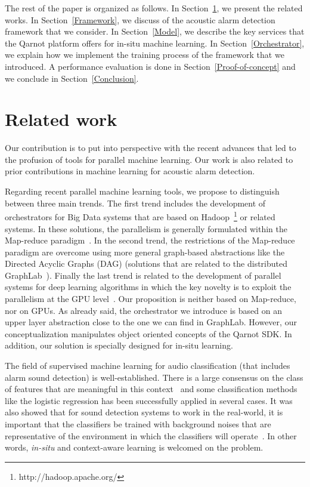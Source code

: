 \documentclass[10pt, conference, compsocconf]{IEEEtran}
\begin{document}
The rest of the paper is organized as follows. In Section~\ref{Related}, we present the related works. 
In Section~\ref{Framework}, we discuss of the acoustic alarm detection framework that we consider. In Section~\ref{Model}, we describe 
the key services that the Qarnot platform offers for in-situ machine learning. In Section~\ref{Orchestrator}, we explain 
how we implement the training process of the framework that we introduced. A performance evaluation is done in 
Section~\ref{Proof-of-concept} and we conclude in Section~\ref{Conclusion}.

\section{Related work} \label{Related}

Our contribution is to put into perspective with the recent advances that led to the profusion of tools for parallel 
machine learning. Our work is also related to prior contributions in machine learning for acoustic alarm detection. 

Regarding recent parallel machine learning tools, we propose to distinguish between three main trends. 
The first trend includes the development of orchestrators for Big Data systems that are based on Hadoop~\footnote{http://hadoop.apache.org/} or related systems. 
In these solutions, the parallelism is generally formulated within the Map-reduce paradigm~\cite{DBLP:journals/cacm/DeanG10}. 
In the second trend, the restrictions of the Map-reduce paradigm are overcome using more general graph-based abstractions like 
the Directed Acyclic Graphs (DAG) (solutions that are related to the distributed GraphLab~\cite{Low:2012:DGF:2212351.2212354}).  Finally the last trend is related to the development of parallel systems for deep learning algorithms in which the key novelty is to exploit the parallelism at the GPU level~\cite{Raina:2009:LDU:1553374.1553486}.
Our proposition is neither based on Map-reduce, nor on GPUs. As already said, the orchestrator we introduce 
is based on an upper layer abstraction close to the one we can find in GraphLab. However, our conceptualization manipulates object 
oriented concepts of the Qarnot SDK. In addition, our solution is specially designed for in-situ learning. 

The field of supervised machine learning for audio classification (that includes alarm sound detection) is well-established. There is a large consensus on the class of features that are meaningful in this context~\cite{Mckinney03featuresfor,DBLP:journals/taslp/JoderER09} 
and some classification methods like the logistic regression has been successfully applied in several cases. It was also showed 
that for sound detection systems to work in the real-world, it is important that the classifiers be trained with 
background noises that are representative of the environment in which the classifiers will operate~\cite{DBLP:conf/icassp/SalamonB15}. 
In other words, {\it in-situ} and context-aware learning is welcomed on the problem. 
\end{document}
